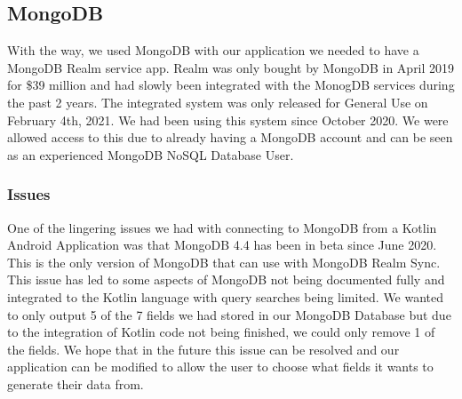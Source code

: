 \subsection{MongoDB}
With the way, we used MongoDB with our application we needed to have a MongoDB Realm service app. Realm was only bought by MongoDB in April 2019 for \$39 million and had slowly been integrated with the MonogDB services during the past 2 years. \cite{ref6} The integrated system was only released for General Use on February 4th, 2021. \cite{ref7} We had been using this system since October 2020. We were allowed access to this due to already having a MongoDB account and can be seen as an experienced MongoDB NoSQL Database User.
\subsubsection{Issues}
One of the lingering issues we had with connecting to MongoDB from a Kotlin Android Application was that MongoDB 4.4 has been in beta since June 2020. \cite{ref8} This is the only version of MongoDB that can use with MongoDB Realm Sync. This issue has led to some aspects of MongoDB not being documented fully and integrated to the Kotlin language with query searches being limited. We wanted to only output 5 of the 7 fields we had stored in our MongoDB Database but due to the integration of Kotlin code not being finished, we could only remove 1 of the fields. We hope that in the future this issue can be resolved and our application can be modified to allow the user to choose what fields it wants to generate their data from.
